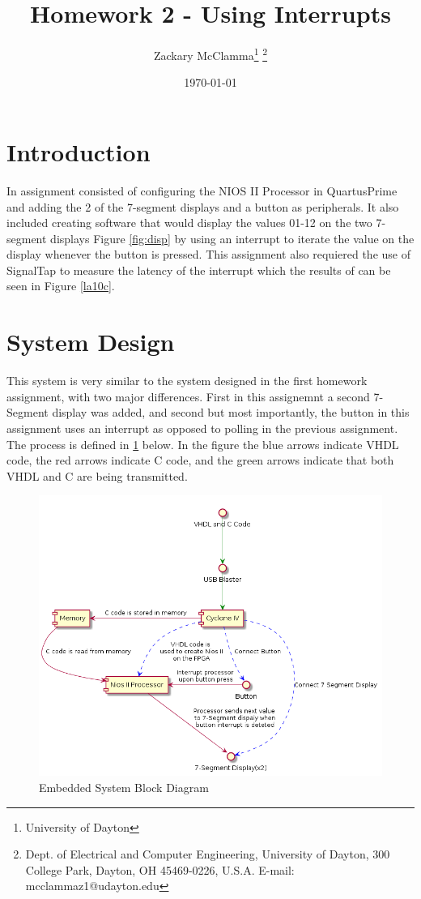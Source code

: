 \documentclass[10pt,a4paper]{article}
\begin{document}
	\title{Homework 2 - Using Interrupts}
	\makeatletter
	
	\author{Zackary McClamma\thanks{University of Dayton}
		\thanks{Dept. of Electrical and Computer
			Engineering, University of Dayton, 300 College Park, Dayton, OH
			45469-0226, U.S.A. E-mail:
			mcclammaz1@udayton.edu}}
	
	\makeatother
	
	\date{\today}
	
	\maketitle
	\section{Introduction}
	In assignment consisted of configuring the NIOS II Processor in QuartusPrime and adding the 2 of the 7-segment displays and a button as peripherals. It also included creating software that would display the values 01-12 on the two 7-segment displays Figure \ref{fig:disp} by using an interrupt to iterate the value on the display whenever the button is pressed. This assignment also requiered the use of SignalTap to measure the latency of the interrupt which the  results of can be seen in Figure \ref{la10c}.
	
	\section{System Design}
	This system is very similar to the system designed in the first homework assignment, with two major differences. First in this assignemnt a second 7-Segment display was added, and second but most importantly, the button in this assignment uses an interrupt as opposed to polling in the previous assignment. The process is defined in \ref{block} below. In the figure the blue arrows indicate VHDL code, the red arrows indicate C code, and the green arrows indicate that both VHDL and C are being transmitted.  
	\begin{figure}
		\centering\includegraphics[width=15cm]{HW2_Block.png}
		\caption{Embedded System Block Diagram}
		\label{block}
	\end{figure}
	
\end{document}
